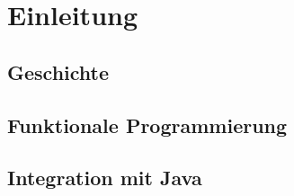 \chapter{Einleitung}

\section{Geschichte}

\section{Funktionale Programmierung}

\section{Integration mit Java}
